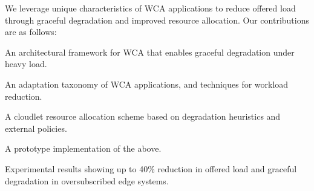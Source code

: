 We leverage unique characteristics of WCA applications to reduce
offered load through graceful degradation and improved resource
allocation.  Our contributions are as follows:
\begin{smitemize}
  \item{An architectural framework for WCA that enables graceful degradation under heavy load.}
  \item{An adaptation taxonomy of WCA applications, and techniques for workload reduction.}
  \item{A cloudlet resource allocation scheme based on degradation heuristics and external policies.}
  \item{A prototype implementation of the above.}
  \item{Experimental results showing up to 40\% reduction in offered load and graceful degradation in oversubscribed edge systems.}
\end{smitemize}







